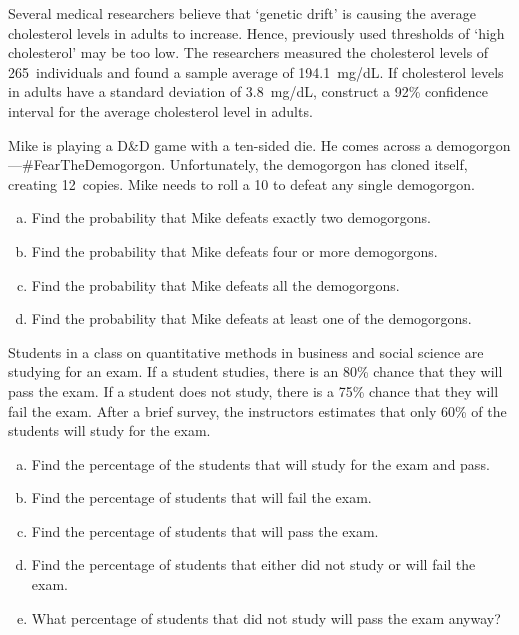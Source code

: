 \documentclass[12pt,letterpaper]{exam}
\begin{document}
\begin{questions}
\newpage
\question[10] Several medical researchers believe that `genetic drift' is causing the average cholesterol levels in adults to increase. Hence, previously used thresholds of `high cholesterol' may be too low. The researchers measured the cholesterol levels of 265~individuals and found a sample average of 194.1~mg/dL. If cholesterol levels in adults have a standard deviation of 3.8~mg/dL, construct a 92\% confidence interval for the average cholesterol level in adults.



\newpage
\question[10] Mike is playing a D\&D game with a ten-sided die. He comes across a demogorgon---\#FearTheDemogorgon. Unfortunately, the demogorgon has cloned itself, creating 12~copies. Mike needs to roll a 10 to defeat any single demogorgon. 
	\begin{enumerate}[(a)]
	\item Find the probability that Mike defeats exactly two demogorgons.
	\item Find the probability that Mike defeats four or more demogorgons.
	\item Find the probability that Mike defeats all the demogorgons.
	\item Find the probability that Mike defeats at least one of the demogorgons. 
	\end{enumerate}



\newpage
\question[15] Students in a class on quantitative methods in business and social science are studying for an exam. If a student studies, there is an 80\% chance that they will pass the exam. If a student does not study, there is a 75\% chance that they will fail the exam. After a brief survey, the instructors estimates that only 60\% of the students will study for the exam. 
	\begin{enumerate}[(a)]
	\item Find the percentage of the students that will study for the exam and pass.
	\item Find the percentage of students that will fail the exam. 
	\item Find the percentage of students that will pass the exam. 
	\item Find the percentage of students that either did not study or will fail the exam.
	\item What percentage of students that did not study will pass the exam anyway?
	\end{enumerate}




\end{questions}
\end{document}

